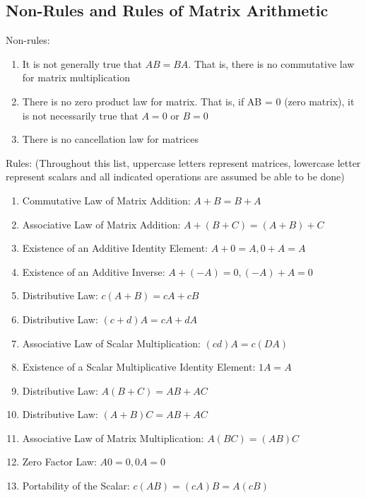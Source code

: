 \documentclass[12pt]{article}
\begin{document}
 \subsection{Non-Rules and Rules of Matrix Arithmetic} 
Non-rules:  \begin{enumerate} 
\item It is not generally true that $AB = BA$. That is, there is no commutative law for matrix multiplication 
\item There is no zero product law for matrix. That is, if AB = 0 (zero matrix), it is not necessarily true that $A = 0$ or $B = 0$ 
\item There is no cancellation law for matrices \end{enumerate}
Rules: (Throughout this list, uppercase letters represent matrices, lowercase letter represent scalars and all indicated operations are assumed be able to be done) \begin{enumerate} 
\item Commutative Law of Matrix Addition: $A + B = B + A$ 
\item Associative Law of Matrix Addition: $ A + (B + C) = (A + B) + C$ 
\item Existence of an Additive Identity Element: $A + 0 = A, 0 + A = A$ 
\item Existence of an Additive Inverse: $A + (-A) = 0, (-A) + A = 0$ 
\item Distributive Law: $c(A + B) = cA + cB$
\item Distributive Law: $(c +d)A = cA + dA$ 
\item Associative Law of Scalar Multiplication: $(cd)A = c(DA)$
\item Existence of a Scalar Multiplicative Identity Element: $1A = A$ 
\item Distributive Law: $A(B + C) = AB + AC$
\item Distributive Law: $(A + B)C = AB + AC$ 
\item Associative Law of Matrix Multiplication: $A(BC) = (AB)C$
\item Zero Factor Law: $A0 = 0, 0A = 0$
\item Portability of the Scalar: $c(AB) = (cA)B = A(cB)$ \end{enumerate} 
\end{document}
